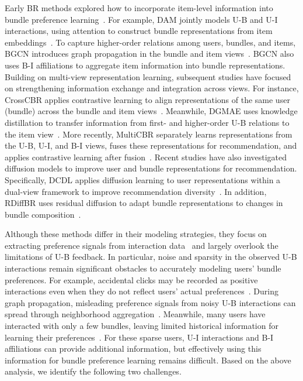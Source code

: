 \documentclass[letterpaper,journal]{IEEEtran}
\begin{document}
Early BR methods explored how to incorporate item-level information into bundle preference learning~\cite{liu2014lire,pathak2017bundlebpr}. For example, DAM jointly models U-B and U-I interactions, using attention to construct bundle representations from item embeddings~\cite{chen2019dam}. To capture higher-order relations among users, bundles, and items, BGCN introduces graph propagation in the bundle and item views~\cite{chang2020bgcn}. BGCN also uses B-I affiliations to aggregate item information into bundle representations. Building on multi-view representation learning, subsequent studies have focused on strengthening information exchange and integration across views. For instance, CrossCBR applies contrastive learning to align representations of the same user (bundle) across the bundle and item views~\cite{ma2022crosscbr}. Meanwhile, DGMAE uses knowledge distillation to transfer information from first- and higher-order U-B relations to the item view~\cite{ren2023dgmae}. More recently, MultiCBR separately learns representations from the U-B, U-I, and B-I views, fuses these representations for recommendation, and applies contrastive learning after fusion~\cite{ma2024multicbr}. Recent studies have also investigated diffusion models to improve user and bundle representations for recommendation. Specifically, DCDL applies diffusion learning to user representations within a dual-view framework to improve recommendation diversity~\cite{chen2025dcdl}. In addition, RDiffBR uses residual diffusion to adapt bundle representations to changes in bundle composition~\cite{zhang2026rdiffbr}.

Although these methods differ in their modeling strategies, they focus on extracting preference signals from interaction data~\cite{ma2024multicbr} and largely overlook the limitations of U-B feedback. In particular, noise and sparsity in the observed U-B interactions remain significant obstacles to accurately modeling users' bundle preferences. For example, accidental clicks may be recorded as positive interactions even when they do not reflect users' actual preferences~\cite{jiang2026cafu}. During graph propagation, misleading preference signals from noisy U-B interactions can spread through neighborhood aggregation~\cite{wu2021sgl}. Meanwhile, many users have interacted with only a few bundles, leaving limited historical information for learning their preferences~\cite{chang2020bgcn}. For these sparse users, U-I interactions and B-I affiliations can provide additional information, but effectively using this information for bundle preference learning remains difficult. Based on the above analysis, we identify the following two challenges.
\end{document}
